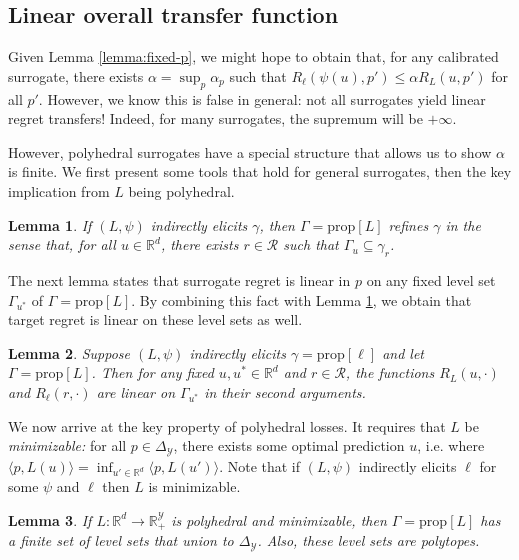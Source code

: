 \documentclass{article}
\newtheorem{lemma}{Lemma}
\theoremstyle{definition}\newtheorem{definition}{Definition}
\theoremstyle{definition}\newtheorem{assumption}{Assumption}
\newcommand{\reals}{\mathbb{R}}
\newcommand{\prop}[1]{\mathrm{prop}[#1]}
\newcommand{\simplex}{\Delta_\Y}
\newcommand{\R}{\mathcal{R}}
\newcommand{\Y}{\mathcal{Y}}
\newcommand{\inprod}[2]{\langle #1, #2 \rangle}%
\begin{document}
\subsection{Linear overall transfer function}
Given Lemma \ref{lemma:fixed-p}, we might hope to obtain that, for any calibrated surrogate, there exists $\alpha = \sup_p \alpha_p$ such that $R_{\ell}(\psi(u),p') \leq \alpha R_L(u,p')$ for all $p'$.
However, we know this is false in general: not all surrogates yield linear regret transfers!
Indeed, for many surrogates, the supremum will be $+\infty$.

However, polyhedral surrogates have a special structure that allows us to show $\alpha$ is finite.
We first present some tools that hold for general surrogates, then the key implication from $L$ being polyhedral.

\begin{lemma} \label{lemma:refines}
  If $(L,\psi)$ indirectly elicits $\gamma$, then $\Gamma = \prop{L}$ \emph{refines} $\gamma$ in the sense that, for all $u \in \reals^d$, there exists $r \in \R$ such that $\Gamma_u \subseteq \gamma_r$.
\end{lemma}

The next lemma states that surrogate regret is linear in $p$ on any fixed level set $\Gamma_{u^*}$ of $\Gamma = \prop{L}$.
By combining this fact with Lemma \ref{lemma:refines}, we obtain that target regret is linear on these level sets as well.
\begin{lemma} \label{lemma:linear-on-levelset}
  Suppose $(L,\psi)$ indirectly elicits $\gamma = \prop{\ell}$ and let $\Gamma = \prop{L}$.
  Then for any fixed $u,u^* \in \reals^d$ and $r \in \R$, the functions $R_L(u,\cdot)$ and $R_{\ell}(r,\cdot)$ are linear on $\Gamma_{u^*}$ in their second arguments.
\end{lemma}

We now arrive at the key property of polyhedral losses.
It requires that $L$ be \emph{minimizable:} for all $p \in \simplex$, there exists some optimal prediction $u$, i.e. where $\inprod{p}{L(u)} = \inf_{u' \in \reals^d} \inprod{p}{L(u')}$.
Note that if $(L,\psi)$ indirectly elicits $\ell$ for some $\psi$ and $\ell$ then $L$ is minimizable.
\begin{lemma} \label{lemma:polyhedral-finite}
  If $L: \reals^d \to \reals_+^{\Y}$ is polyhedral and minimizable, then $\Gamma = \prop{L}$ has a finite set of level sets that union to $\simplex$. Also, these level sets are polytopes.
\end{lemma}
\end{document}
